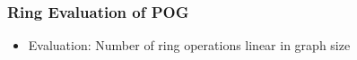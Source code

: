 \documentclass[t,pdf]{beamer}
\begin{document}
\begin{frame}
  \frametitle{Ring Evaluation of POG}

\medskip
\begin{minipage}{0.49\textwidth}
  \centering{
  
  } %
\end{minipage}
\begin{minipage}{0.49\textwidth}
  \centering{
  
  } %
\end{minipage}

\medskip

\begin{itemize}
\item Evaluation: Number of ring operations linear in graph size
\end{itemize}

\end{frame}
\end{document}
